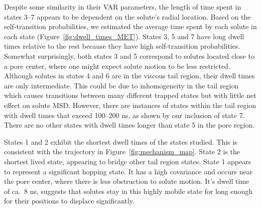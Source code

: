 \documentclass[journal=jpcbfk,manuscript=article]{achemso}
\begin{document}
  Despite some similarity in their VAR parameters, the length of time spent in states 
  3--7 appears to be dependent on the solute's radial location. Based on the 
  self-transition probabilities, we estimated the average time spent by each solute in
  each state (Figure~\ref{fig:dwell_times_MET}). States 3, 5 and 7 have long dwell times
  relative to the rest because they have high self-transition probabilities. Somewhat 
  surprisingly, both states 3 and 5 correspond to solutes located close to a pore center,
  where one might expect solute motion to be less restricted. Although solutes in states
  4 and 6 are in the viscous tail region, their dwell times are only intermediate. This
  could be due to inhomogeneity in the tail region which causes transitions between many
  different trapped states but with little net effect on solute MSD. However, there are
  instances of states within the tail region with dwell times that exceed 100--200 ns,
  as shown by our inclusion of state 7. There are no other states with dwell times longer
  than state 5 in the pore region.
  
  States 1 and 2 exhibit the shortest dwell times of the states studied. This is 
  consistent with the trajectory in Figure~\ref{fig:mechanism_map}. State 2 is the 
  shortest lived state, appearing to bridge other tail region states. State 1 
  appears to represent a significant hopping state. It has a high covariance and
  occurs near the pore center, where there is less obstruction to solute motion.
  It's dwell time of ca.~8 ns, suggests that solutes stay in this highly mobile 
  state for long enough for their positions to displace significantly.
  
\end{document}

